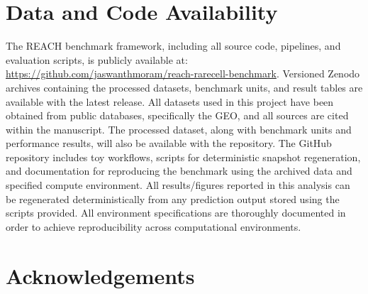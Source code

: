 \documentclass[10pt]{article}
\begin{document}
\section*{Data and Code Availability}

The REACH benchmark framework, including all source code, pipelines, and evaluation scripts, is publicly available at: \url{https://github.com/jaswanthmoram/reach-rarecell-benchmark}. Versioned Zenodo archives containing the processed datasets, benchmark units, and result tables are available with the latest release.
All datasets used in this project have been obtained from public databases, specifically the GEO, and all sources are cited within the manuscript. The processed dataset, along with benchmark units and performance results, will also be available with the repository.
The GitHub repository includes toy workflows, scripts for deterministic snapshot regeneration, and documentation for reproducing the benchmark using the archived data and specified compute environment. All results/figures reported in this analysis can be regenerated deterministically from any prediction output stored using the scripts provided. All environment specifications are thoroughly documented in order to achieve reproducibility across computational environments.

\section*{Acknowledgements}

\nocite{*}


\end{document}
